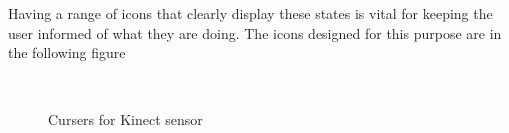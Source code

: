 \begin{enumerate}
Having a range of icons that clearly display these states is vital for keeping
the user informed of what they are doing. The icons designed for this purpose
are in the following figure

\begin{figure}[h!]
  \centering
  ~
  \caption{Cursers for Kinect sensor}  
\end{figure}


\end{enumerate}


